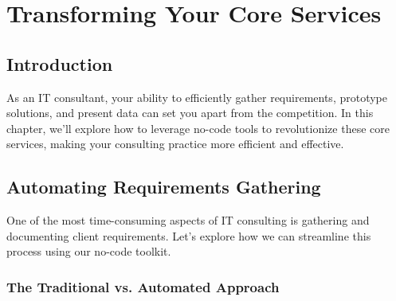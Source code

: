 \chapter{Transforming Your Core Services}


\section{Introduction}

As an IT consultant, your ability to efficiently gather requirements, prototype solutions, and present data can set you apart from the competition. In this chapter, we'll explore how to leverage no-code tools to revolutionize these core services, making your consulting practice more efficient and effective.


\section{Automating Requirements Gathering}

One of the most time-consuming aspects of IT consulting is gathering and documenting client requirements. Let's explore how we can streamline this process using our no-code toolkit.

\subsection{The Traditional vs. Automated Approach}

